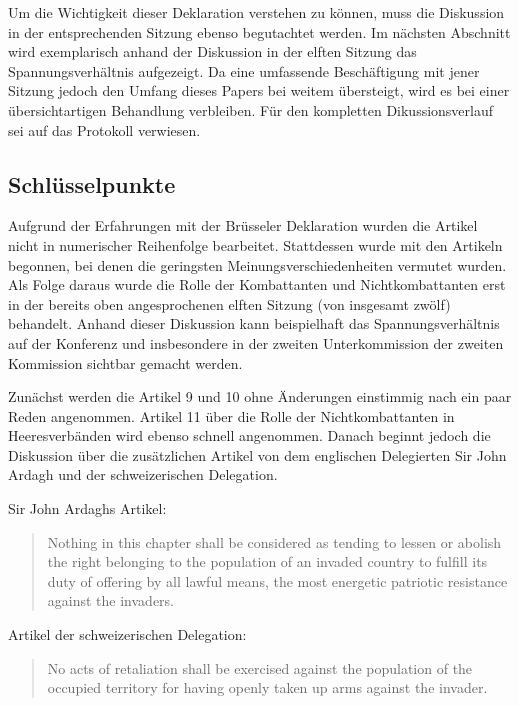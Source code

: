 \documentclass[12pt]{scrartcl}
\begin{document}
Um die Wichtigkeit dieser Deklaration verstehen zu können, muss die Diskussion in der entsprechenden Sitzung ebenso begutachtet werden. Im nächsten Abschnitt wird exemplarisch anhand der Diskussion in der elften Sitzung das Spannungsverhältnis aufgezeigt. Da eine umfassende Beschäftigung mit jener Sitzung jedoch den Umfang dieses Papers bei weitem übersteigt, wird es bei einer übersichtartigen Behandlung verbleiben. Für den kompletten Dikussionsverlauf sei auf das Protokoll verwiesen.

\subsection{Schlüsselpunkte}

Aufgrund der Erfahrungen mit der Brüsseler Deklaration wurden die Artikel nicht in numerischer Reihenfolge bearbeitet. Stattdessen wurde mit den Artikeln begonnen, bei denen die geringsten Meinungsverschiedenheiten vermutet wurden. Als Folge daraus wurde die Rolle der Kombattanten und Nichtkombattanten erst in der bereits oben angesprochenen elften Sitzung (von insgesamt zwölf) behandelt. Anhand dieser Diskussion kann beispielhaft das Spannungsverhältnis auf der Konferenz und insbesondere in der zweiten Unterkommission der zweiten Kommission sichtbar gemacht werden.

Zunächst werden die Artikel 9 und 10 ohne Änderungen einstimmig nach ein paar Reden angenommen. Artikel 11 über die Rolle der Nichtkombattanten in Heeresverbänden wird ebenso schnell angenommen. Danach beginnt jedoch die Diskussion über die zusätzlichen Artikel von dem englischen Delegierten Sir John Ardagh und der schweizerischen Delegation.

Sir John Ardaghs Artikel:
\begin{quotation}
	Nothing in this chapter shall be considered as tending to lessen or abolish 
the right belonging to the population of an invaded country to fulfill its
duty of offering by all lawful means, the most energetic patriotic resistance
against the invaders.
\end{quotation}

Artikel der schweizerischen Delegation:
\begin{quotation}
	No acts of retaliation shall be exercised against the population of the
occupied territory for having openly taken up arms against the invader.
\end{quotation}
\end{document}
